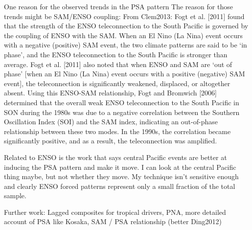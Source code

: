 One reason for the observed trends in the PSA pattern 
The reason for those trends might be SAM/ENSO coupling: From Clem2013: Fogt et al. [2011] found that the strength of the ENSO teleconnection to the South Pacific is governed by the coupling of ENSO with the SAM. When an El Nino (La Nina) event occurs with a negative (positive) SAM event, the two climate patterns are said to be ‘in phase’, and the ENSO teleconnection to the South Pacific is stronger than average. Fogt et al. [2011] also noted that when ENSO and SAM are ‘out of phase’ [when an El Nino (La Nina) event occurs with a positive (negative) SAM event], the teleconnection is significantly weakened, displaced, or altogether absent. Using this ENSO-SAM relationship, Fogt and Bromwich [2006] determined that the overall weak ENSO teleconnection to the South Pacific in SON during the 1980s was due to a negative correlation between the Southern Oscillation Index (SOI) and the SAM index, indicating an out-of-phase relationship between these two modes. In the 1990s, the correlation became significantly positive, and as a result, the teleconnection was amplified.

Related to ENSO is the work that says central Pacific events are better at inducing the PSA pattern and make it move. I can look at the central Pacific thing maybe, but not whether they move. My technique isn't sensitive enough and clearly ENSO forced patterns represent only a small fraction of the total sample.




Further work: Lagged composites for tropical drivers, PNA, more detailed account of PSA like Kosaka, SAM / PSA relationship (better Ding2012)